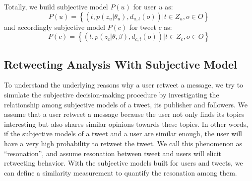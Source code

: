 \documentclass{acm_proc_article-sp}
\begin{document}
Totally, we build subjective model $ P\left( u \right) $ for user $ u $ as:
\begin{equation}
\label{subuser}
P\left( u \right)= \left\lbrace \left( t, p\left( z_{u} \vert \theta_{u} \right), d_{u,t}\left( o \right) \right)  \vert t \in Z_{u}, o \in O  \right\rbrace  
\end{equation}
and accordingly subjective model $ P\left( c \right) $ for tweet $ c $ as:
\begin{equation}
\label{subtweet}
P\left( c \right)= \left\lbrace \left( t, p\left( z_{c} \vert \theta, \beta \right), d_{c,t}\left( o \right) \right)  \vert t \in Z_{c}, o \in O  \right\rbrace  
\end{equation}

\subsection{Retweeting Analysis With Subjective Model}
\label{formulation}
To understand the underlying reasons why a user retweet a message, we try to simulate the subjective decision-making procedure by investigating the relationship among subjective models of a tweet, its publisher and followers. 
We assume that a user retweet a message because the user not only finds its topics interesting but also shares similar opinions towards these topics. In other words, if the subjective models of a tweet and a user are similar enough, the user will have a very high probability to retweet the tweet. 
We call this phenomenon as ``resonation'', and assume resonation between tweet and users will elicit retweeting behavior.
With the subjective models built for users and tweets, we can define a similarity measurement to quantify the resonation among them.
\end{document}
